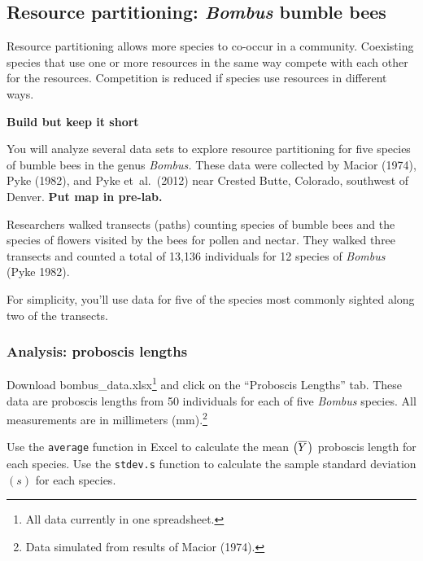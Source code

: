 \documentclass[12pt, hidelinks]{exam}
\newcommand*\meanY{\overline{Y}\kern0.67pt}
\begin{document}
\subsection*{Resource partitioning: \textit{Bombus} bumble bees}

Resource partitioning allows more species to co-occur in a community.
Coexisting species that use one or more resources in the same way compete
with each other for the resources. Competition is reduced if species
use resources in different ways.

\textbf{Build but keep it short}


You will analyze several data sets to explore resource partitioning for five
species of bumble bees in the genus \textit{Bombus.} These data were collected
by Macior (1974), Pyke (1982), and Pyke et~al.~(2012) near Crested Butte, Colorado,
southwest of Denver. \textbf{Put map in pre-lab.}

Researchers walked transects (paths) counting species of bumble bees and the 
species of flowers visited by the bees for pollen and nectar. They walked
three transects and counted a total of 13,136 individuals for 12 species of 
\textit{Bombus} (Pyke 1982).

For simplicity, you'll use data for five of the species most commonly 
sighted along two of the transects.


\subsubsection*{Analysis: proboscis lengths}

Download bombus\_data.xlsx\footnote{All data currently in one
spreadsheet.} and click on the “Proboscis Lengths” tab. These data are
 proboscis lengths from 50 individuals for each of five \textit{Bombus} species. All measurements are in millimeters (mm).\footnote{Data simulated 
from results of Macior (1974).}

Use the \texttt{average} function in Excel to calculate the mean $\left(\meanY\right)$ proboscis length for each species. Use the \texttt{stdev.s} function
to calculate the sample standard deviation $\left(s\right)$ for each species. %
%
%
\end{document}
